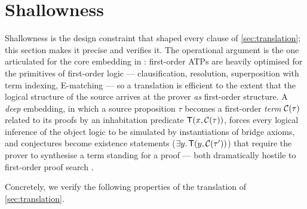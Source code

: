 \section{Shallowness}
\label{sec:shallow}

Shallowness is the design constraint that shaped every clause of
\cref{sec:translation}; this section makes it precise and verifies it.
The operational argument is the one articulated for the core embedding in
\cite[\S 1.1]{Czajka2018}: first-order ATPs are heavily optimised for the
primitives of first-order logic --- clausification, resolution,
superposition with term indexing, E-matching --- so a translation is
efficient to the extent that the logical structure of the source arrives
at the prover \emph{as} first-order structure.  A \emph{deep} embedding,
in which a source proposition $\tau$ becomes a first-order \emph{term}
$\mathcal{C}(\tau)$ related to its proofs by an inhabitation predicate
$\mathsf{T}(x, \mathcal{C}(\tau))$, forces every logical inference of the
object logic to be simulated by instantiations of bridge axioms, and
conjectures become existence statements ($\exists y.\,\mathsf{T}(y,
\mathcal{C}(\tau'))$) that require the prover to synthesise a term standing
for a proof --- both dramatically hostile to first-order proof search
\cite[\S 1.1]{Czajka2018}.

Concretely, we verify the following properties of the translation of
\cref{sec:translation}.

